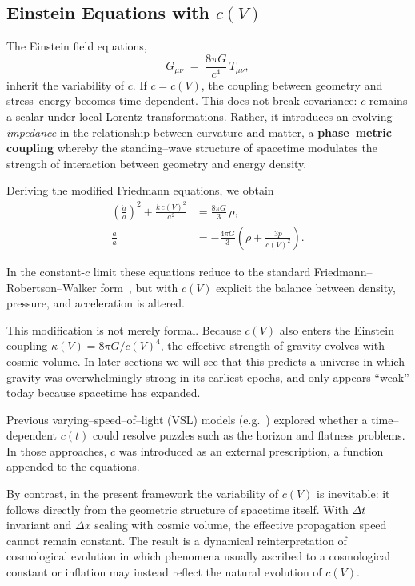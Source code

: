 \documentclass[12pt]{article}
\begin{document}
\subsection{Einstein Equations with \texorpdfstring{$c(V)$}{c(V)}}

The Einstein field equations,
\begin{equation}
  G_{\mu\nu} \;=\; \frac{8\pi G}{c^4}\,T_{\mu\nu},
\end{equation}
inherit the variability of \(c\).  If \(c = c(V)\), the coupling between geometry and stress–energy becomes time dependent.  This does not break covariance: \(c\) remains a scalar under local Lorentz transformations.  Rather, it introduces an evolving \emph{impedance} in the relationship between curvature and matter, a \textbf{phase–metric coupling} whereby the standing–wave structure of spacetime modulates the strength of interaction between geometry and energy density.

Deriving the modified Friedmann equations, we obtain
\begin{align}
  \left(\frac{\dot{a}}{a}\right)^2 + \frac{k\, c(V)^2}{a^2} &= \frac{8 \pi G}{3}\,\rho, \\
  \frac{\ddot{a}}{a} &= -\frac{4 \pi G}{3}\!\left( \rho + \frac{3p}{c(V)^2} \right).
\end{align}

In the constant-$c$ limit these equations reduce to the standard Friedmann–Robertson–Walker form~\cite{frw}, but with $c(V)$ explicit the balance between density, pressure, and acceleration is altered.  

This modification is not merely formal. Because $c(V)$ also enters the Einstein coupling $\kappa(V) = 8\pi G / c(V)^4$, the effective strength of gravity evolves with cosmic volume. In later sections we will see that this predicts a universe in which gravity was overwhelmingly strong in its earliest epochs, and only appears ``weak'' today because spacetime has expanded.

Previous varying–speed–of–light (VSL) models (e.g.\ \cite{albrecht1999,barrow1999,magueijo2003}) explored whether a time– dependent \(c(t)\) could resolve puzzles such as the horizon and flatness problems.  In those approaches, \(c\) was introduced as an external prescription, a function appended to the equations.

By contrast, in the present framework the variability of \(c(V)\) is inevitable: it follows directly from the geometric structure of spacetime itself.  With \(\Delta t\) invariant and \(\Delta x\) scaling with cosmic volume, the effective propagation speed cannot remain constant.  The result is a dynamical reinterpretation of cosmological evolution in which phenomena usually ascribed to a cosmological constant or inflation may instead reflect the natural evolution of \(c(V)\).
\end{document}
